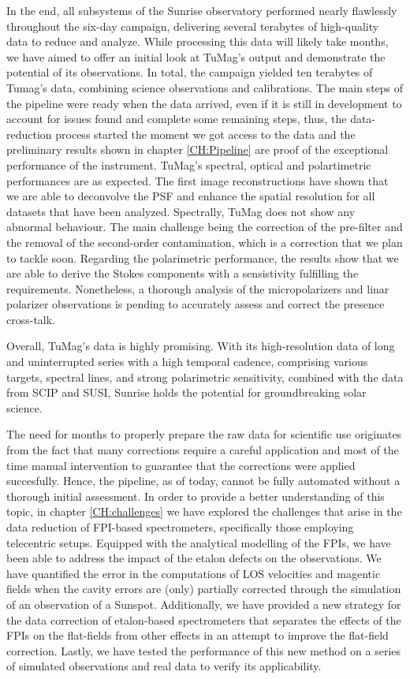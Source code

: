 In the end, all subsystems of the Sunrise observatory performed nearly flawlessly throughout the six-day campaign, delivering several terabytes of high-quality data to reduce and analyze. While processing this data will likely take months, we have aimed to offer an initial look at TuMag’s output and demonstrate the potential of its observations. In total, the campaign yielded ten terabytes of Tumag's data, combining science observations and calibrations. The main steps of the pipeline were ready when the data arrived, even if it is still in development to account for issues found and complete some remaining steps, thus, the data-reduction process started the moment we got access to the data and the preliminary results shown in chapter \ref{CH:Pipeline} are proof of the exceptional performance of the instrument. TuMag's spectral, optical and polartimetric performances are as expected. The first image reconstructions have shown that we are able to deconvolve the PSF and enhance the spatial resolution for all datasets that have been analyzed. Spectrally, TuMag does not show any abnormal behaviour. The main challenge being the correction of the pre-filter and the removal of the second-order contamination, which is a correction that we plan to tackle soon. Regarding the polarimetric performance, the results show that we are able to derive the Stokes components with a sensistivity fulfilling the requirements. Nonetheless, a thorough analysis of the micropolarizers and linar polarizer observations is pending to accurately assess and correct the presence cross-talk.

Overall, TuMag’s data is highly promising. With its high-resolution data of long and uninterrupted series with a high temporal cadence, comprising various targets, spectral lines, and strong polarimetric sensitivity, combined with the data from SCIP and SUSI, Sunrise holds the potential for groundbreaking solar science. 

The need for months to properly prepare the raw data for scientific use originates from the fact that many corrections require a careful application and most of the time manual intervention to guarantee that the corrections were applied succesfully. Hence, the pipeline, as of today, cannot be fully automated without a thorough initial assessment. In order to provide a better understanding of this topic, in chapter \ref{CH:challenges} we have explored the challenges that arise in the data reduction of FPI-based spectrometers, specifically those employing telecentric setups. Equipped with the analytical modelling of the FPIs, we have been able to address the impact of the etalon defects on the observations. We have quantified the error in the computations of LOS velocities and magentic fields when the cavity errors are (only) partially corrected through the simulation of an observation of a Sunspot. Additionally, we have provided a new strategy for the data correction of etalon-based spectrometers that separates the effects of the FPIs on the flat-fields from other effects in an attempt to improve the flat-field correction. Lastly, we have tested the performance of this new method on a series of simulated observations and real data to verify its applicability. 

